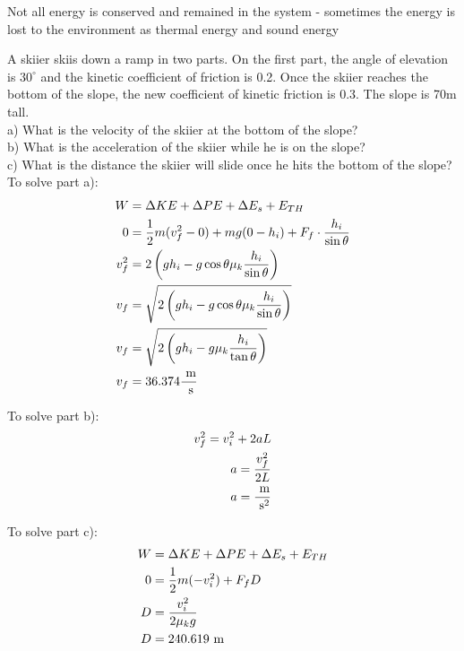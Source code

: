 Not all energy is conserved and remained in the system - sometimes the energy is lost to the environment as thermal energy and sound energy


\begin{problem}
    A skiier skiis down a ramp in two parts. On the first part, the angle of elevation is $30^\circ$ and the kinetic coefficient of friction is 0.2. Once the skiier reaches the bottom of the slope, the new coefficient of kinetic friction is 0.3. The slope is 70m tall.\\

    a) What is the velocity of the skiier at the bottom of the slope?\\

    b) What is the acceleration of the skiier while he is on the slope?\\

    c) What is the distance the skiier will slide once he hits the bottom of the slope?\\

    To solve part a):
    $$
    \begin{aligned}
        W &= \Delta KE + \Delta PE + \Delta E_s + E_{TH}\\
        0 &= \frac{1}{2}m(v_f^2-0) + mg(0-h_i) + F_f\cdot\frac{h_i}{\sin\theta}\\
        v_f^2 &= 2\left(gh_i - g\cos\theta\mu_k\frac{h_i}{\sin\theta}\right)\\
        v_f &= \sqrt{2\left(gh_i - g\cos\theta\mu_k\frac{h_i}{\sin\theta}\right)}\\
        v_f &= \sqrt{2\left(gh_i - g\mu_k\frac{h_i}{\tan\theta}\right)}\\
        v_f &= 36.374 \frac{\text{ m}}{\text{ s}}
    \end{aligned}
    $$

    To solve part b):
    $$
    \begin{aligned}
        v_f^2 = v_i^2 + 2aL\\
        a = \frac{v_f^2}{2L}\\
        a = \frac{\text{ m}}{\text{ s}^2}
    \end{aligned}
    $$

    To solve part c):
    $$
    \begin{aligned}
        W &= \Delta KE + \Delta PE + \Delta E_s + E_{TH}\\
        0 &= \frac{1}{2}m(-v_i^2)+F_fD\\
        D &= \frac{v_i^2}{2\mu_kg}\\
        D &= 240.619\text{ m}
    \end{aligned}
    $$
\end{problem}